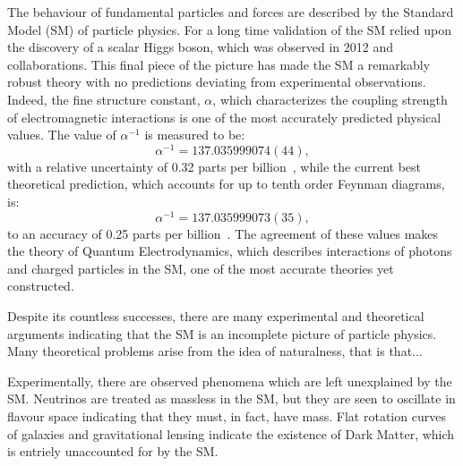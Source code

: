 The behaviour of fundamental particles and forces are described by the Standard Model (SM) of
particle physics.
For a long time validation of the SM relied upon the discovery of a scalar Higgs boson, which was
observed in 2012 \cms and \atlas collaborations.
This final piece of the picture has made the SM a remarkably robust theory with no predictions
deviating from experimental observations.
Indeed, the fine structure constant, $\alpha$, which characterizes the coupling strength of
electromagnetic interactions is one of the most accurately predicted physical values.
The value of $\alpha^{-1}$ is measured to be:
\begin{equation}
  \alpha^{-1} = 137.035 999 074 (44),
\end{equation}
with a relative uncertainty of 0.32 parts per billion~\cite{PDG2012}, while the current best theoretical
prediction, which accounts for up to tenth order Feynman diagrams, is:
\begin{equation}
  \alpha^{-1} = 137.035 999 073 (35),
\end{equation}
to an accuracy of 0.25 parts per billion~\cite{Aoyama:2012wj}.
The agreement of these values makes the theory of Quantum Electrodynamics, which describes
interactions of photons and charged particles in the SM, one of the most accurate theories yet
constructed.

Despite its countless successes,
there are many experimental and theoretical arguments indicating that the SM is an incomplete
picture of particle physics.
Many theoretical problems arise from the idea of naturalness, that is that...

Experimentally, there are observed phenomena which are left unexplained by the SM.
Neutrinos are treated as massless in the SM, but they are seen to oscillate in flavour space
indicating that they must, in fact, have mass.
Flat rotation curves of galaxies and gravitational lensing indicate the existence of Dark Matter,
which is entriely unaccounted for by the SM.

